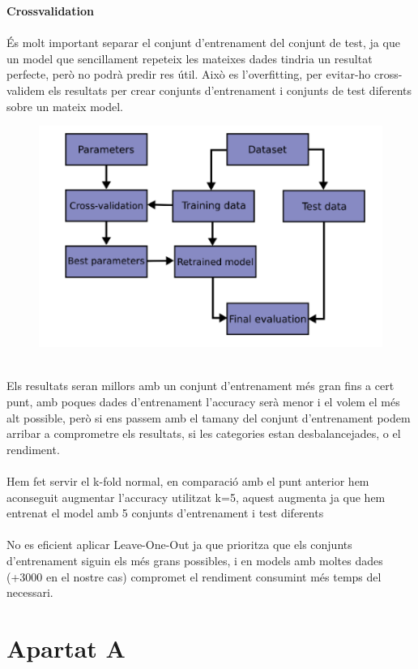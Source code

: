 \documentclass{article}
\begin{document}
\noindent
	\textbf{Crossvalidation}\\
	\\
	És molt important separar el conjunt d'entrenament del conjunt de test, ja que un model que sencillament repeteix les mateixes dades tindria un resultat perfecte, però no podrà predir res útil. Això es l'overfitting, per evitar-ho cross-validem els resultats per crear conjunts d'entrenament i conjunts de test diferents sobre un mateix model.\\
	\begin{figure}[!h]
		\centering
		\includegraphics[width=0.4\linewidth]{../images/crossvalidation}
		\caption*{}
		\label{fig:crossvalidation}
	\end{figure}\\
	Els resultats seran millors amb un conjunt d'entrenament més gran fins a cert punt, amb poques dades d'entrenament l'accuracy serà menor i el volem el més alt possible, però si ens passem amb el tamany del conjunt d'entrenament podem arribar a comprometre els resultats, si les categories estan desbalancejades, o el rendiment.\\
	\\
	Hem fet servir el k-fold normal, en comparació amb el punt anterior hem aconseguit augmentar l'accuracy utilitzat k=5, aquest augmenta ja que hem entrenat el model amb 5 conjunts d'entrenament i test diferents\\
	\\
	No es eficient aplicar Leave-One-Out ja que prioritza que els conjunts d'entrenament siguin els més grans possibles, i en models amb moltes dades (+3000 en el nostre cas) compromet el rendiment consumint més temps del necessari.
	
	
	

	
	\section*{Apartat A}

	
	
\end{document}
